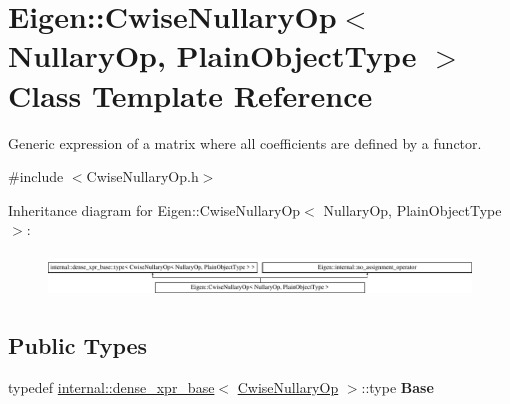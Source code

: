 \hypertarget{class_eigen_1_1_cwise_nullary_op}{}\section{Eigen\+::Cwise\+Nullary\+Op$<$ Nullary\+Op, Plain\+Object\+Type $>$ Class Template Reference}
\label{class_eigen_1_1_cwise_nullary_op}


Generic expression of a matrix where all coefficients are defined by a functor.  




{\ttfamily \#include $<$Cwise\+Nullary\+Op.\+h$>$}

Inheritance diagram for Eigen\+::Cwise\+Nullary\+Op$<$ Nullary\+Op, Plain\+Object\+Type $>$\+:\begin{figure}[H]
\begin{center}
\leavevmode
\includegraphics[height=1.140530cm]{class_eigen_1_1_cwise_nullary_op}
\end{center}
\end{figure}
\subsection*{Public Types}
\begin{DoxyCompactItemize}
\item 
\mbox{\label{class_eigen_1_1_cwise_nullary_op_aca6bcc51d5daecca299ea247a31e5c39}} 
typedef \mbox{\hyperlink{struct_eigen_1_1internal_1_1dense__xpr__base}{internal\+::dense\+\_\+xpr\+\_\+base}}$<$ \mbox{\hyperlink{class_eigen_1_1_cwise_nullary_op}{Cwise\+Nullary\+Op}} $>$\+::type {\bfseries Base}
\end{DoxyCompactItemize}
